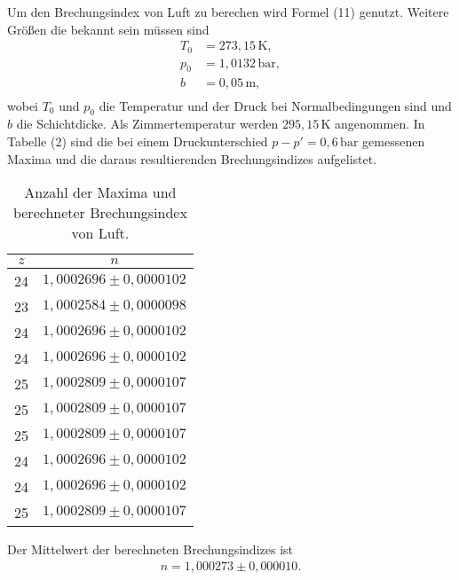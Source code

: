 Um den Brechungsindex von Luft zu berechen wird Formel (11) genutzt. Weitere Größen die bekannt sein müssen sind
\begin{align*}
T_0 &= 273,15 \,\si{\kelvin},\\
p_0 &= 1,0132 \,\si{\bar},\\
b &= 0,05 \,\si{\meter},\\
\end{align*}
wobei $T_0$ und $p_0$ die Temperatur und der Druck bei Normalbedingungen sind und $b$ die Schichtdicke.
Als Zimmertemperatur werden $295,15 \,\si{\kelvin}$ angenommen.
In Tabelle (2) sind die bei einem Druckunterschied $p-p'= 0,6 \,\si{\bar}$ gemessenen Maxima und die daraus resultierenden Brechungsindizes aufgelistet.
\begin{table}[H]
\centering
\caption{Anzahl der Maxima und berechneter Brechungsindex von Luft.}
\label{tab:einzel1}
\begin{tabular}{c c}
\toprule
$z$ & $n$\\
\midrule
24 & $1,0002696 \pm 0,0000102$ \\
23 & $1,0002584 \pm 0,0000098$ \\
24 & $1,0002696 \pm 0,0000102$ \\
24 & $1,0002696 \pm 0,0000102$ \\
25 & $1,0002809 \pm 0,0000107$ \\
25 & $1,0002809 \pm 0,0000107$ \\
25 & $1,0002809 \pm 0,0000107$ \\
24 & $1,0002696 \pm 0,0000102$ \\
24 & $1,0002696 \pm 0,0000102$ \\
25 & $1,0002809 \pm 0,0000107$ \\
\bottomrule
\end{tabular}
\end{table}
Der Mittelwert der berechneten Brechungsindizes ist
\begin{align*}
n = 1,000273 \pm 0,000010 .
\end{align*}


